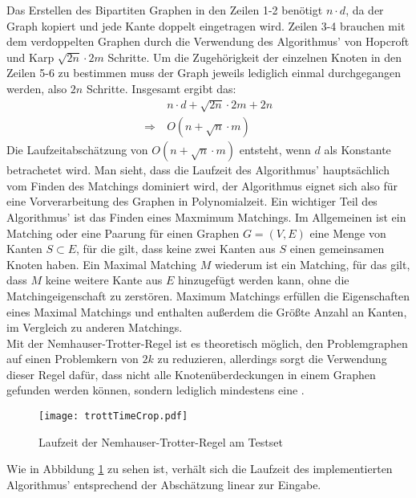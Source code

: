 Das Erstellen des Bipartiten Graphen in den Zeilen 1-2 benötigt $n \cdot d$, da der Graph kopiert und jede Kante doppelt eingetragen wird. Zeilen 3-4 brauchen mit dem verdoppelten Graphen durch die Verwendung des Algorithmus' von Hopcroft und Karp $\sqrt{2n} \cdot 2m$ Schritte. Um die Zugehörigkeit der einzelnen Knoten in den Zeilen 5-6 zu bestimmen muss der Graph jeweils lediglich einmal durchgegangen werden, also $2n$ Schritte. Insgesamt ergibt das:
\begin{align}
&\ n \cdot d + \sqrt{2n} \cdot 2m + 2n\\
\Rightarrow &\ O(n + \sqrt{n} \cdot m)
\end{align}
Die Laufzeitabschätzung von  $O(n + \sqrt{n} \cdot m)$ entsteht, wenn $d$ als Konstante betrachetet wird. Man sieht, dass die Laufzeit des Algorithmus' hauptsächlich vom Finden des Matchings dominiert wird, der Algorithmus eignet sich also für eine Vorverarbeitung des Graphen in Polynomialzeit.
Ein wichtiger Teil des Algorithmus' ist das Finden eines Maxmimum Matchings. Im Allgemeinen ist ein Matching oder eine Paarung für einen Graphen $G=(V,E)$ eine Menge von Kanten $S \subset E$, für die gilt, dass keine zwei Kanten aus $S$ einen gemeinsamen Knoten haben. Ein Maximal Matching $M$ wiederum ist ein Matching, für das gilt, dass $M$ keine weitere Kante aus $E$ hinzugefügt werden kann, ohne die Matchingeigenschaft zu zerstören. Maximum Matchings erfüllen die Eigenschaften eines Maximal Matchings und enthalten außerdem die Größte Anzahl an Kanten, im Vergleich zu anderen Matchings.\\
Mit der Nemhauser-Trotter-Regel ist es theoretisch möglich, den Problemgraphen auf einen Problemkern von $2k$ zu reduzieren, allerdings sorgt die Verwendung dieser Regel dafür, dass nicht alle Knotenüberdeckungen in einem Graphen gefunden werden können, sondern lediglich mindestens eine \cite{fixed}.
\begin{figure}[htb]
\centering
  	{\texttt{[image: trottTimeCrop.pdf]}}
	\caption{Laufzeit der Nemhauser-Trotter-Regel am Testset\label{fig:trottTime}}
\centering
\end{figure}Wie in Abbildung \ref{fig:trottTime} zu sehen ist, verhält sich die Laufzeit des implementierten Algorithmus' entsprechend der Abschätzung linear zur Eingabe.
